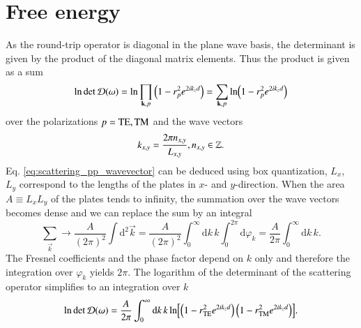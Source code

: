\section{Free energy}
\label{section_scattering_pp_free_energy}

As the round-trip operator is diagonal in the plane wave basis, the determinant
is given by the product of the diagonal matrix elements. Thus the product is given
as a sum
\begin{equation}
\text{ln} \det \mathcal{D}(\omega) = \text{ln} \prod_{{\mathbf{k}}, p} \left(1 - r_p^2 e^{2 i k_z d}\right) = \sum_{{\mathbf{k}}, p} \text{ln}{\left(1 - r_p^2 e^{2 ik_z d}\right)}
\end{equation}
over the polarizations $p=\mathrm{TE},\mathrm{TM}$ and the wave vectors
\begin{equation}
\label{eq:scattering_pp_wavevector}
k_{x,y} = \frac{2\pi n_{x,y}}{L_{x,y}}, \\ n_{x,y}\in \mathbb{Z}.
\end{equation}
Eq. \eqref{eq:scattering_pp_wavevector} can be deduced using box quantization,
$L_x$, $L_y$ correspond to the lengths of the plates in $x$- and $y$-direction.
When the area $A \equiv L_xL_y$ of the plates tends to infinity, the summation
over the wave vectors becomes dense and we can replace the sum by an integral
\cite{ThermodynamicalLimit}
\begin{equation}
\sum_{\vec k} \rightarrow \frac{A}{(2\pi)^2} \int \mathrm{d}^2 \vec k = \frac{A}{(2\pi)^2} \int_0^\infty \mathrm{d}k \, k \int_0^{2\pi} \mathrm{d}\varphi_k = \frac{A}{2\pi} \int_0^\infty \mathrm{d}k \, k.
\end{equation}
The Fresnel coefficients and the phase factor depend on $k$ only and therefore
the integration over $\varphi_k$ yields $2\pi$. The logarithm of the
determinant of the scattering operator simplifies to an integration over $k$
\begin{equation}
\label{eq:scattering_pp_integral_plain}
\text{ln} \det \mathcal{D}(\omega) = \frac{A}{2\pi} \int_0^\infty \mathrm{d}k \, k \, \text{ln}{\left[\left(1-r_{\mathrm{TE}}^2e^{2ik_z d}\right) \left(1-r_{\mathrm{TM}}^2 e^{2ik_z d}\right)\right]}.
\end{equation}
